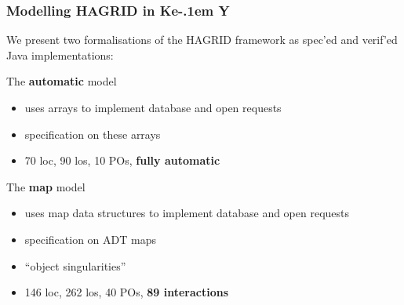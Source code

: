 \documentclass{beamer}
\newcommand{\KeY}{Ke\kern-.1em Y}
\begin{document}
\begin{frame}
  \frametitle{Modelling HAGRID in \KeY}

  We present two formalisations of the HAGRID framework as spec'ed and
  verif'ed Java implementations:
  \pause
  
  \begin{block}{The \textbf{automatic} model}
    \begin{itemize}
    \item uses arrays to implement database and open requests
    \item specification on these arrays
    \item 70 loc, 90 los, 10 POs, \textbf{fully automatic}
    \end{itemize}
  \end{block}

    
  
  \pause
  \begin{exampleblock}{The \textbf{map} model}
  \begin{itemize}
    \item uses map data structures to implement database and open requests
    \item specification on ADT maps
    \item ``object singularities''
    \item 146 loc, 262 los, 40 POs, \textbf{89 interactions}
    \end{itemize}
  \end{exampleblock}
  
\end{frame}
\end{document}
